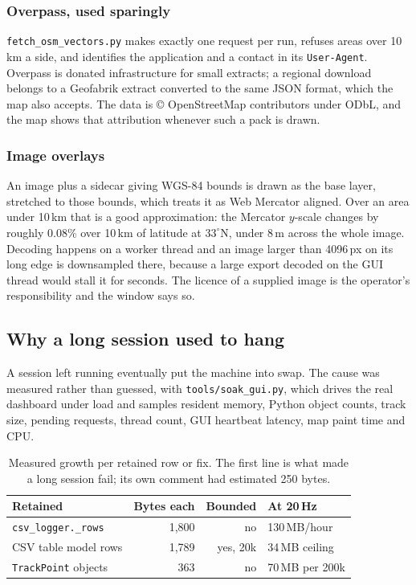 \documentclass[11pt,a4paper]{article}
\begin{document}
\subsubsection{Overpass, used sparingly}

\texttt{fetch\_osm\_vectors.py} makes exactly one request per run, refuses
areas over 10\,km a side, and identifies the application and a contact in
its \texttt{User-Agent}. Overpass is donated infrastructure for small
extracts; a regional download belongs to a Geofabrik extract converted to
the same JSON format, which the map also accepts. The data is
\copyright{} OpenStreetMap contributors under ODbL, and the map shows that
attribution whenever such a pack is drawn.

\subsubsection{Image overlays}

An image plus a sidecar giving WGS-84 bounds is drawn as the base layer,
stretched to those bounds, which treats it as Web Mercator aligned. Over an
area under 10\,km that is a good approximation: the Mercator $y$-scale
changes by roughly 0.08\% over 10\,km of latitude at $33^{\circ}$N, under
8\,m across the whole image. Decoding happens on a worker thread and an
image larger than 4096\,px on its long edge is downsampled there, because a
large export decoded on the GUI thread would stall it for seconds. The
licence of a supplied image is the operator's responsibility and the window
says so.

\subsection{Why a long session used to hang}
\label{sec:map-soak}

A session left running eventually put the machine into swap. The cause was
measured rather than guessed, with \texttt{tools/soak\_gui.py}, which drives
the real dashboard under load and samples resident memory, Python object
counts, track size, pending requests, thread count, GUI heartbeat latency,
map paint time and CPU.

\begin{table}[htbp]
\centering
\begin{tabularx}{\textwidth}{@{}lrrX@{}}
\toprule
\textbf{Retained} & \textbf{Bytes each} & \textbf{Bounded} & \textbf{At 20\,Hz} \\
\midrule
\texttt{csv\_logger.\_rows} & 1{,}800 & no & 130\,MB/hour \\
CSV table model rows & 1{,}789 & yes, 20k & 34\,MB ceiling \\
\texttt{TrackPoint} objects & 363 & no & 70\,MB per 200k \\
\bottomrule
\end{tabularx}
\caption{Measured growth per retained row or fix. The first line is what
made a long session fail; its own comment had estimated 250 bytes.}
\end{table}
\end{document}
